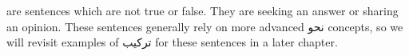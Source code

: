 \documentclass[../main.tex]{subfiles}
\begin{document}

\begin{english}
     are sentences which are not true or false. They are seeking an answer or sharing an opinion. These sentences generally rely on more advanced \textarabic{نحو} concepts, so we will revisit examples of \textarabic{تركيب} for these sentences in a later chapter.
\end{english}
\end{document}

